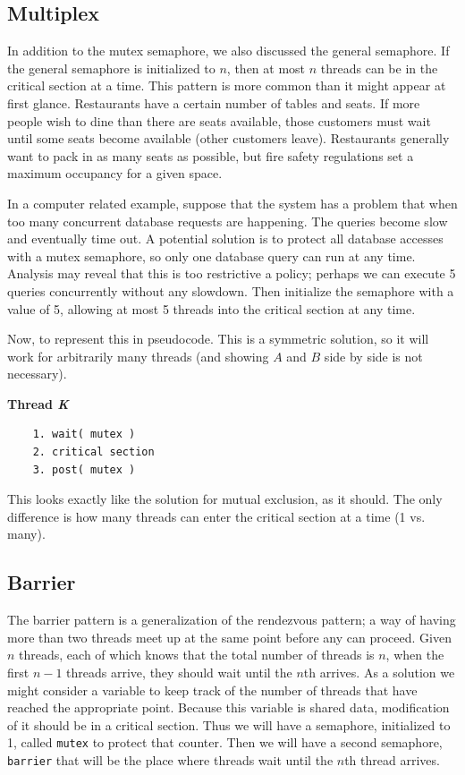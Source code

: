 \subsection*{Multiplex}
In addition to the mutex semaphore, we also discussed the general semaphore. If the general semaphore is initialized to $n$, then at most $n$ threads can be in the critical section at a time. This pattern is more common than it might appear at first glance. Restaurants have a certain number of tables and seats. If more people wish to dine than there are seats available, those customers must wait until some seats become available (other customers leave). Restaurants generally want to pack in as many seats as possible, but fire safety regulations set a maximum occupancy for a given space.

In a computer related example, suppose that the system has a problem that when too many concurrent database requests are happening. The queries become slow and eventually time out. A potential solution is to protect all database accesses with a mutex semaphore, so only one database query can run at any time. Analysis may reveal that this is too restrictive a policy; perhaps we can execute 5 queries concurrently without any slowdown. Then initialize the semaphore with a value of 5, allowing at most 5 threads into the critical section at any time.

Now, to represent this in pseudocode. This is a symmetric solution, so it will work for arbitrarily many threads (and showing $A$ and $B$ side by side is not necessary).

\textbf{Thread \textit{K}}\vspace{-2em}
\begin{verbatim}
	1. wait( mutex )
	2. critical section
	3. post( mutex )
  \end{verbatim}
\vspace{-2em}

This looks exactly like the solution for mutual exclusion, as it should. The only difference is how many threads can enter the critical section at a time (1 vs. many).


\subsection*{Barrier}
The barrier pattern is a generalization of the rendezvous pattern; a way of having more than two threads meet up at the same point before any can proceed. Given $n$ threads, each of which knows that the total number of threads is $n$, when the first $n-1$ threads arrive, they should wait until the $n$th arrives. As a solution we might consider a variable to keep track of the number of threads that have reached the appropriate point. Because this variable is shared data, modification of it should be in a critical section.  Thus we will have a semaphore, initialized to 1, called \texttt{mutex} to protect that counter. Then we will have a second semaphore, \texttt{barrier} that will be the place where threads wait until the $n$th thread arrives.


